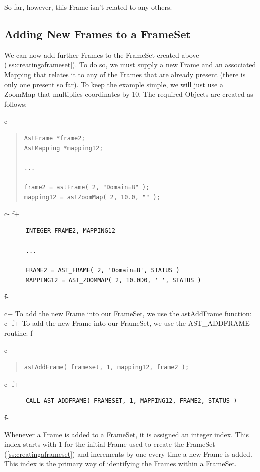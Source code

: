 \documentclass[twoside,11pt]{article}
\newcommand{\secref}[1]{\S\ref{#1}}
\renewcommand{\secref}[1]{\ref{#1}}
\begin{document}
So far, however, this Frame isn't related to any others.

\subsection{\label{ss:addingframes}Adding New Frames to a FrameSet}

We can now add further Frames to the FrameSet created above
(\secref{ss:creatingaframeset}). To do so, we must supply a new Frame
and an associated Mapping that relates it to any of the Frames that
are already present (there is only one present so far).  To keep the
example simple, we will just use a ZoomMap that multiplies coordinates
by 10. The required Objects are created as follows:

c+
\begin{quote}
\small
\begin{verbatim}
AstFrame *frame2;
AstMapping *mapping12;

...

frame2 = astFrame( 2, "Domain=B" );
mapping12 = astZoomMap( 2, 10.0, "" );
\end{verbatim}
\normalsize
\end{quote}
c-
f+
\small
\begin{verbatim}
      INTEGER FRAME2, MAPPING12

      ...

      FRAME2 = AST_FRAME( 2, 'Domain=B', STATUS )
      MAPPING12 = AST_ZOOMMAP( 2, 10.0D0, ' ', STATUS )
\end{verbatim}
\normalsize
f-

c+
To add the new Frame into our FrameSet, we use the astAddFrame
function:
c-
f+
To add the new Frame into our FrameSet, we use the AST\_ADDFRAME
routine:
f-

c+
\begin{quote}
\small
\begin{verbatim}
astAddFrame( frameset, 1, mapping12, frame2 );
\end{verbatim}
\normalsize
\end{quote}
c-
f+
\small
\begin{verbatim}
      CALL AST_ADDFRAME( FRAMESET, 1, MAPPING12, FRAME2, STATUS )
\end{verbatim}
\normalsize
f-

Whenever a Frame is added to a FrameSet, it is assigned an integer
index. This index starts with 1 for the initial Frame used to create
the FrameSet (\secref{ss:creatingaframeset}) and increments by one
every time a new Frame is added. This index is the primary way of
identifying the Frames within a FrameSet.
\end{document}
